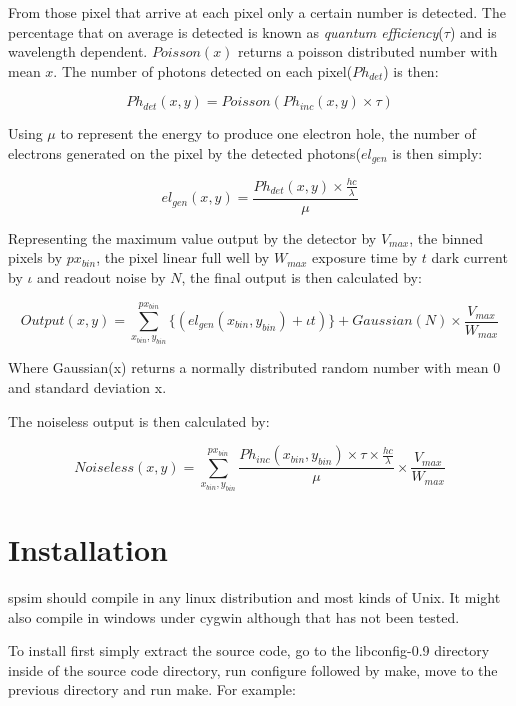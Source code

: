 \documentclass{report}
\begin{document}
From those pixel that arrive at each pixel only a certain number is detected. The percentage that on average is detected is known as
{\em quantum efficiency}($\tau$) and is wavelength dependent. $Poisson(x)$ returns a poisson distributed number with mean $x$.
The number of photons detected on each pixel($Ph_{det}$) is then:


\begin{equation}
  Ph_{det}(x,y) = Poisson(Ph_{inc}(x,y) \times \tau)
\end{equation}

Using $\mu$ to represent the energy to produce one electron hole, the number of electrons generated on the pixel by the detected photons($el_{gen}$ is then simply:


\begin{equation}
  el_{gen}(x,y) = \frac{Ph_{det}(x,y) \times \frac{hc}{\lambda}}{\mu}
\end{equation}


Representing the maximum value output by the detector by $V_{max}$, the binned pixels by $px_{bin}$, the pixel linear full well by $W_{max}$ exposure time by $t$
dark current by $\iota$ and readout noise by $N$,
 the final output is then calculated by:


\begin{equation}
  Output(x,y) = \sum_{x_{bin},y_{bin}}^{px_{bin}} \{\left( el_{gen}(x_{bin},y_{bin}) + \iota t \right)\}  + Gaussian(N) \times \frac{V_{max}}{W_{max}}
\end{equation}

Where Gaussian(x) returns a normally distributed random number with mean 0 and standard deviation x.

The noiseless output is then calculated by:

\begin{equation}
  Noiseless(x,y) = \sum_{x_{bin},y_{bin}}^{px_{bin}} \frac{Ph_{inc}(x_{bin},y_{bin}) \times \tau \times  \frac{hc}{\lambda}}{\mu} \times \frac{V_{max}}{W_{max}}
\end{equation}


\chapter{Installation }

spsim should compile in any linux distribution and most kinds of Unix. It might also compile in windows under cygwin although that
has not been tested.


To install first simply extract the source code, go to the libconfig-0.9 directory inside of the source code directory, run configure followed by make,
move to the previous directory and run make. For example:
\end{document}
